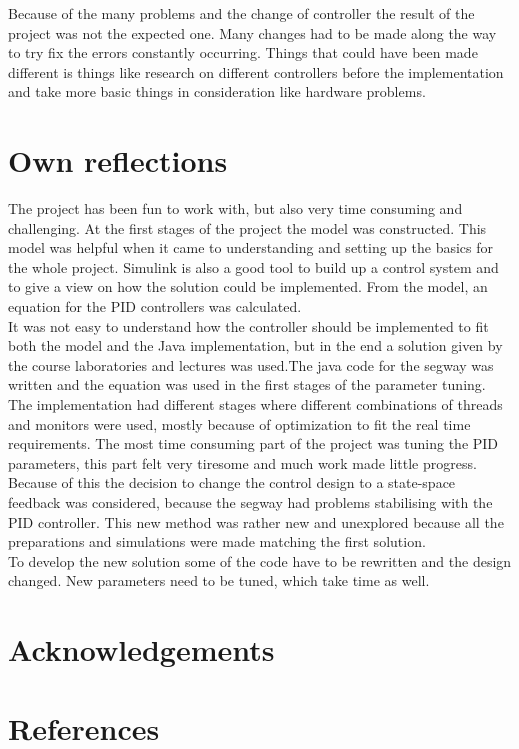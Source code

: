 \documentclass[a4paper]{article}
\begin{document}
Because of the many problems and the change of controller the result of the project was not the expected one. Many changes had  to be made along the way to try fix the errors constantly occurring. Things that could have been made different is things like research on different controllers before the implementation and take more basic things in consideration like hardware problems.  


\section{Own reflections}
The project has been fun to work with, but also very time consuming and challenging. At the first stages of the project the model was constructed. This model was helpful when it came to understanding and setting up the basics for the whole project. Simulink is also a good tool to build up a control system and to give a view on how the solution could be implemented. From the model, an equation for the PID controllers was calculated. \\

It was not easy to understand how the controller should be implemented to fit both the model and the Java implementation, but in the end a solution given by the course laboratories and lectures was used.The java code for the segway was written and the equation was used in the first stages of the parameter tuning. The implementation had different stages where different combinations of threads and monitors were used, mostly because of optimization to fit the real time requirements. The most time consuming part of the project was tuning the PID parameters, this part felt very tiresome and much work made little progress. Because of this the decision to change the control design to a state-space feedback was considered, because the segway had problems stabilising with the PID controller. This new method was rather new and unexplored because all the preparations and simulations were made matching the first solution. \\

To develop the new solution some of the code have to be rewritten and the design changed. New parameters need to be tuned, which take time as well. \\


\section{Acknowledgements}

\section{References}
\end{document}

